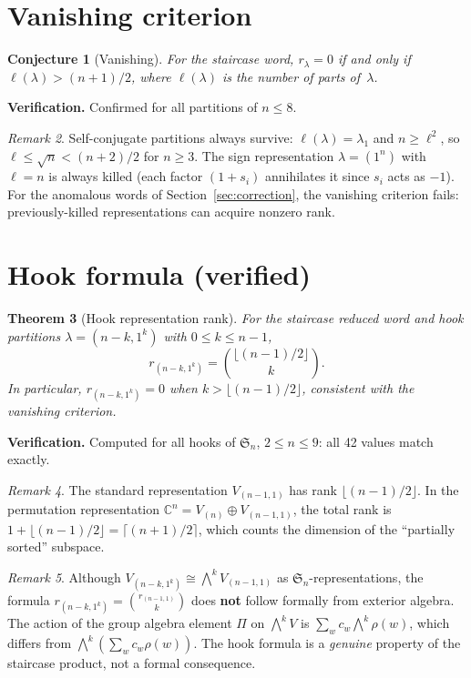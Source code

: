 \documentclass[11pt]{article}
\newtheorem{theorem}{Theorem}
\newtheorem{conjecture}[theorem]{Conjecture}
\theoremstyle{definition}
\theoremstyle{remark}
\newtheorem{remark}[theorem]{Remark}
\newcommand{\CC}{\mathbb{C}}
\newcommand{\Sym}{\mathfrak{S}}
\begin{document}
\section{Vanishing criterion}

\begin{conjecture}[Vanishing]
\label{conj:vanish}
For the staircase word, $r_\lambda = 0$ if and only if
$\ell(\lambda) > (n+1)/2$, where $\ell(\lambda)$ is the number of parts
of~$\lambda$.
\end{conjecture}

\noindent\textbf{Verification.} Confirmed for all partitions of $n \le 8$.

\begin{remark}
Self-conjugate partitions always survive: $\ell(\lambda) = \lambda_1$ and
$n \ge \ell^2$, so $\ell \le \sqrt{n} < (n+2)/2$ for $n \ge 3$.
The sign representation $\lambda = (1^n)$ with $\ell = n$ is always killed
(each factor $(1+s_i)$ annihilates it since $s_i$ acts as $-1$).
For the anomalous words of Section~\ref{sec:correction}, the vanishing
criterion fails: previously-killed representations can acquire nonzero rank.
\end{remark}


\section{Hook formula (verified)}

\begin{theorem}[Hook representation rank]
\label{thm:hook}
For the staircase reduced word and hook partitions
$\lambda = (n-k, 1^k)$ with $0 \le k \le n-1$,
\[
  r_{(n-k, 1^k)} = \binom{\lfloor (n-1)/2 \rfloor}{k}.
\]
In particular, $r_{(n-k,1^k)} = 0$ when $k > \lfloor (n-1)/2 \rfloor$,
consistent with the vanishing criterion.
\end{theorem}

\noindent\textbf{Verification.}
Computed for all hooks of $\Sym_n$, $2 \le n \le 9$: all 42 values match exactly.

\begin{remark}
The standard representation $V_{(n-1,1)}$ has rank $\lfloor(n-1)/2\rfloor$.
In the permutation representation $\CC^n = V_{(n)} \oplus V_{(n-1,1)}$, the
total rank is $1 + \lfloor(n-1)/2\rfloor = \lceil(n+1)/2\rceil$, which
counts the dimension of the ``partially sorted'' subspace.
\end{remark}

\begin{remark}
Although $V_{(n-k,1^k)} \cong \bigwedge^k V_{(n-1,1)}$ as $\Sym_n$-representations,
the formula $r_{(n-k,1^k)} = \binom{r_{(n-1,1)}}{k}$ does \textbf{not} follow
formally from exterior algebra. The action of the group algebra element $\Pi$
on $\bigwedge^k V$ is $\sum_w c_w \bigwedge^k \rho(w)$, which differs from
$\bigwedge^k(\sum_w c_w \rho(w))$. The hook formula is a \emph{genuine} property
of the staircase product, not a formal consequence.
\end{remark}
\end{document}
